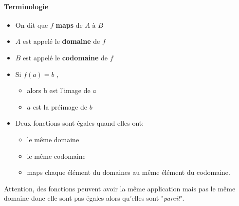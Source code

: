 \paragraph{Terminologie}
\begin{itemize}
    \item On dit que $f$ \textbf{maps} de $A$ à $B$
    \item $A$ est appelé le \textbf{domaine} de $f$
    \item $B$ est appelé le \textbf{codomaine} de $f$
    \item Si $f(a) = b$ ,
    \begin{itemize}
        \item alors b est l'image de $a$
        \item $a$ est la préimage de $b$
    \end{itemize}
    \item Deux fonctions sont égales quand elles ont:
    \begin{itemize}
        \item le même domaine
        \item le même codomaine
        \item maps chaque élément du domaines au même élément du codomaine.
    \end{itemize}
\end{itemize}
\begin{center}
    
\end{center}
\begin{framedremark}
    Attention, des fonctions peuvent avoir la même application mais pas le même domaine donc elle sont pas égales alors qu'elles sont "\textit{pareil}".
\end{framedremark}



